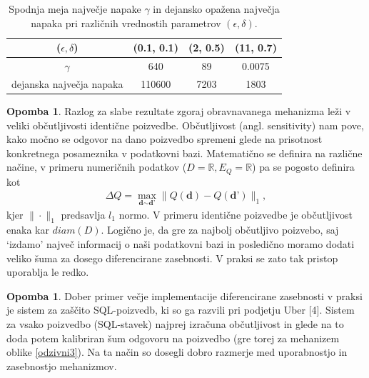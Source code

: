 \documentclass[12pt,a4paper]{amsart}
\theoremstyle{definition} %
\newtheorem{opomba}[definicija]{Opomba}
\theoremstyle{plain} %
\begin{document}
\begin{table}[h]
\begin{center}
 \begin{tabular}{| c | c | c | c |} 
 \hline
($\epsilon, \delta$) & (0.1, 0.1) & (2, 0.5) & (11, 0.7)  \\ [0.5ex] 
 \hline
 $\gamma$ & 640 & 89 & 0.0075  \\ 
 \hline
 dejanska največja napaka & 110600 & 7203 & 1803\\
 \hline
\end{tabular}
\caption{Spodnja meja največje napake $\gamma$ in dejansko opažena največja napaka pri različnih vrednostih parametrov $(\epsilon, \delta)$. }
\end{center}
\end{table}
\begin{opomba}
Razlog za slabe rezultate zgoraj obravnavanega mehanizma leži v veliki občutljivosti identične poizvedbe. Občutljivost (angl. sensitivity) nam pove, kako močno se odgovor na dano poizvedbo spremeni glede na prisotnost konkretnega posameznika v podatkovni bazi. Matematično se definira na različne načine, v primeru numeričnih podatkov ($D = \mathbb{R}, E_Q = \mathbb{R}$) pa se pogosto definira kot
\begin{gather*}
\Delta Q = \max_{\textbf{d} \sim \textbf{d'}} \| Q(\textbf{d}) - Q(\textbf{d'}) \|_1 ,
\end{gather*}
kjer $\| \cdot \|_1$ predsavlja $l_1$ normo. V primeru identične poizvedbe je občutljivost enaka kar $diam(D)$. Logično je, da gre za najbolj občutljivo poizvebo, saj `izdamo' največ informacij o naši podatkovni bazi in posledično moramo dodati veliko šuma za dosego diferencirane zasebnosti. V praksi se zato tak pristop uporablja le redko.
\end{opomba}
\begin{opomba}
Dober primer večje implementacije diferencirane zasebnosti v praksi je sistem za zaščito SQL-poizvedb, ki so ga razvili pri podjetju Uber [4]. Sistem za vsako poizvedbo (SQL-stavek) najprej izračuna občutljivost in glede na to doda potem kalibriran šum odgovoru na poizvedbo (gre torej za mehanizem oblike \eqref{odzivni3}). Na ta način so dosegli dobro razmerje med uporabnostjo in zasebnostjo mehanizmov.
\end{opomba}
\end{document}
